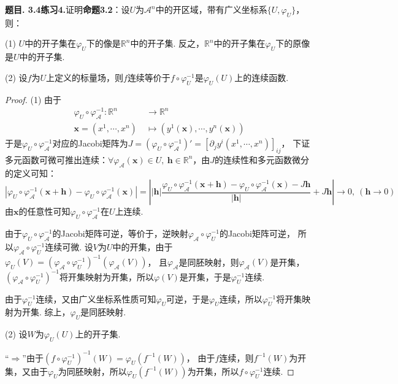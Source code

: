 \documentclass[12pt, a4paper, oneside]{ctexart}
\newcounter{problem}  %
\newenvironment{problem}[1][]{\stepcounter{problem}\par\noindent\textbf{题目\arabic{problem}. #1}}{\smallskip\par}
\def\bd{\boldsymbol}        %
\def\R{\mathbb{R}}          %
\def\A{\mathcal{A}}         %
\def\del{\vspace{-1.5ex}}   %
\begin{document}
\begin{problem}[3.4练习4.]证明\textbf{命题3.2}：设$U$为$\mathscr{A}^n$中的开区域，带有广义坐标系$\{U,\varphi_U\}$，则：

    (1) $U$中的开子集在$\varphi_U$下的像是$\R^n$中的开子集. 反之，$\R^n$中的开子集在$\varphi_U$下的原像是$U$中的开子集.

    (2) 设$f$为$U$上定义的标量场，则$f$连续等价于$f\circ\varphi_U^{-1}$是$\varphi_U(U)$上的连续函数.
\end{problem}
\begin{proof}
    (1) 由于\del\del
    \begin{align*}
        \varphi_U\circ\varphi_{\A}^{-1}:\R^n&\ \to \R^n\\
        \bd{x} = (x^1,\cdots,x^n)&\ \mapsto (y^1(\bd{x}),\cdots,y^n(\bd{x}))
    \end{align*}
    于是$\varphi_U\circ\varphi_{\A}^{-1}$对应的Jacobi矩阵为$J = (\varphi_U\circ\varphi_{\A}^{-1})'= [\partial_jy^i(x^1,\cdots,x^n)]_{ij}$，
    下证多元函数可微可推出连续：$\forall \varphi_\A(\bd{x})\in U,\ \bd{h}\in\R^n$，由$J$的连续性和多元函数微分的定义可知：
    \begin{equation*}
        |\varphi_U\circ\varphi_{\A}^{-1}(\bd{x}+\bd{h}) - \varphi_U\circ\varphi_{\A}^{-1}(\bd{x})| = 
        \left||\bd{h}|\frac{\varphi_U\circ\varphi_{\A}^{-1}(\bd{x}+\bd{h}) - \varphi_U\circ\varphi_{\A}^{-1}(\bd{x})-J\bd{h}}{|\bd{h}|}+J\bd{h}\right|\to 0,\ (\bd{h}\to 0)
    \end{equation*}
    由$\bd{x}$的任意性可知$\varphi_U\circ\varphi_{\A}^{-1}$在$U$上连续.

    由于$\varphi_U\circ\varphi_{\A}^{-1}$的Jacobi矩阵可逆，等价于，逆映射$\varphi_{\A}\circ\varphi_U^{-1}$的Jacobi矩阵可逆，
    所以$\varphi_{\A}\circ\varphi_U^{-1}$连续可微. 设$V$为$U$中的开集，由于$\varphi_U(V) = (\varphi_{\A}\circ\varphi_U^{-1})^{-1}(\varphi_\A(V))$，
    且$\varphi_\A$是同胚映射，则$\varphi_\A(V)$是开集，$(\varphi_{\A}\circ\varphi_U^{-1})^{-1}$将开集映射为开集，所以$\varphi(V)$是开集，于是$\varphi_U^{-1}$连续.

    由于$\varphi_U^{-1}$连续，又由广义坐标系性质可知$\varphi_U$可逆，于是$\varphi_U$连续，所以$\varphi_U^{-1}$将开集映射为开集.
    综上，$\varphi_U$是同胚映射.

    (2) 设$W$为$\varphi_U(U)$上的开子集.
    
    “$\Rightarrow$”由于$(f\circ \varphi_U^{-1})^{-1}(W) = \varphi_U(f^{-1}(W))$，
    由于$f$连续，则$f^{-1}(W)$为开集，又由于$\varphi_U$为同胚映射，所以$\varphi_U(f^{-1}(W))$为开集，所以$f\circ\varphi_U^{-1}$连续.


\end{proof}
\end{document}
